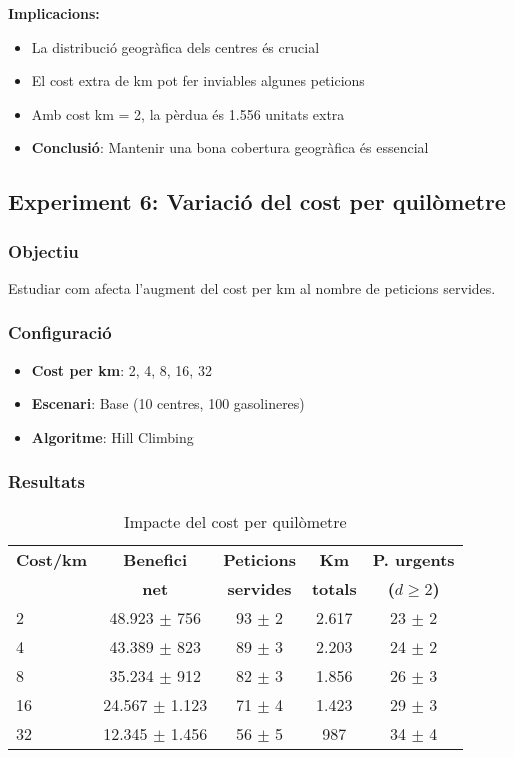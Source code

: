 \textbf{Implicacions:}
\begin{itemize}
    \item La distribució geogràfica dels centres és crucial
    \item El cost extra de km pot fer inviables algunes peticions
    \item Amb cost km = 2, la pèrdua és 1.556 unitats extra
    \item \textbf{Conclusió}: Mantenir una bona cobertura geogràfica és essencial
\end{itemize}

\subsection{Experiment 6: Variació del cost per quilòmetre}

\subsubsection{Objectiu}
Estudiar com afecta l'augment del cost per km al nombre de peticions servides.

\subsubsection{Configuració}
\begin{itemize}
    \item \textbf{Cost per km}: 2, 4, 8, 16, 32
    \item \textbf{Escenari}: Base (10 centres, 100 gasolineres)
    \item \textbf{Algoritme}: Hill Climbing
\end{itemize}

\subsubsection{Resultats}

\begin{table}[H]
\centering
\begin{tabular}{@{}lcccc@{}}
\toprule
\textbf{Cost/km} & \textbf{Benefici} & \textbf{Peticions} & \textbf{Km} & \textbf{P. urgents} \\
 & \textbf{net} & \textbf{servides} & \textbf{totals} & \textbf{($d \geq 2$)} \\
\midrule
2 & 48.923 $\pm$ 756 & 93 $\pm$ 2 & 2.617 & 23 $\pm$ 2 \\
4 & 43.389 $\pm$ 823 & 89 $\pm$ 3 & 2.203 & 24 $\pm$ 2 \\
8 & 35.234 $\pm$ 912 & 82 $\pm$ 3 & 1.856 & 26 $\pm$ 3 \\
16 & 24.567 $\pm$ 1.123 & 71 $\pm$ 4 & 1.423 & 29 $\pm$ 3 \\
32 & 12.345 $\pm$ 1.456 & 56 $\pm$ 5 & 987 & 34 $\pm$ 4 \\
\bottomrule
\end{tabular}
\caption{Impacte del cost per quilòmetre}
\label{tab:exp6-cost}
\end{table}

